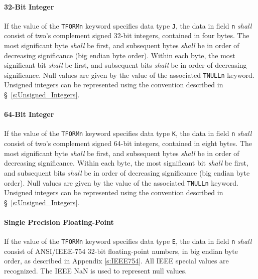 \documentclass[11pt,makeidx]{book}     %
\begin{document}
    \paragraph{32-Bit Integer} 
    If the value of 
    the {\tt TFORMn} keyword specifies data type {\tt J}, the 
    data in field {\tt n} {\em shall} consist
    of two's complement signed 32-bit integers, 
    contained in four bytes.
    The most significant byte {\em shall} be first, and 
    subsequent bytes {\em shall} be in order of decreasing significance (big endian byte order). 
    Within each byte, the most significant bit {\em shall} be first, and 
    subsequent bits {\em shall} be in order of decreasing significance. 
    Null values are given by the value of the 
    associated {\tt TNULLn} keyword.
    Unsigned integers can be represented using the convention described 
    in \S~\ref{s:Unsigned_Integers}.

    \paragraph{64-Bit Integer} 
    If the value of 
    the {\tt TFORMn} keyword specifies data type {\tt K}, the 
    data in field {\tt n} {\em shall} consist
    of two's complement signed 64-bit integers, 
    contained in eight bytes.
    The most significant byte {\em shall} be first, and 
    subsequent bytes {\em shall} be in order of decreasing significance. 
    Within each byte, the most significant bit {\em shall} be first, and 
    subsequent bits {\em shall} be in order of decreasing significance (big endian byte order). 
    Null values are given by the value of the 
    associated {\tt TNULLn} keyword.
    Unsigned integers can be represented using the convention described 
    in \S~\ref{s:Unsigned_Integers}.

    \paragraph{Single Precision Floating-Point}
    If the value of the {\tt TFORMn} keyword 
    specifies data type {\tt E}, the data in 
    field {\tt n} {\em shall} consist of 
    ANSI/IEEE-754 \cite{ieee85} 32-bit floating-point 
    numbers, in big endian byte order, as described in Appendix \ref{s:IEEE754}.   
    All IEEE special values are recognized.
    The IEEE NaN is used to represent null values.
\end{document}
